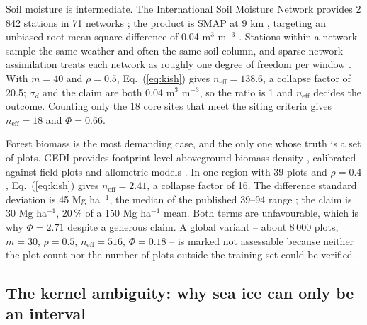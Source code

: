 \documentclass[preprint,12pt,authoryear]{elsarticle}
\begin{document}
Soil moisture is intermediate. The International Soil Moisture Network provides 2\,842 stations in 71 networks \citep{dorigo2011international,dorigo2021international}; the product is SMAP at 9 km \citep{entekhabi2010soil}, targeting an unbiased root-mean-square difference of 0.04 m$^3$ m$^{-3}$ \citep{colliander2017validation}. Stations within a network sample the same weather and often the same soil column, and sparse-network assimilation treats each network as roughly one degree of freedom per window \citep{gruber2018sparse}. With $m = 40$ and $\rho = 0.5$, Eq.~(\ref{eq:kish}) gives $n_{\mathrm{eff}} = 138.6$, a collapse factor of 20.5; $\sigma_d$ and the claim are both 0.04 m$^3$ m$^{-3}$, so the ratio is 1 and $n_{\mathrm{eff}}$ decides the outcome. Counting only the 18 core sites that meet the siting criteria gives $n_{\mathrm{eff}} = 18$ and $\Phi = 0.66$.

Forest biomass is the most demanding case, and the only one whose truth is a set of plots. GEDI provides footprint-level aboveground biomass density \citep{dubayah2020global,duncanson2022aboveground,gedi_l4a}, calibrated against field plots and allometric models \citep{chave2014improved,saatchi2011benchmark}. In one region with 39 plots and $\rho = 0.4$, Eq.~(\ref{eq:kish}) gives $n_{\mathrm{eff}} = 2.41$, a collapse factor of 16. The difference standard deviation is 45 Mg ha$^{-1}$, the median of the published 39--94 range \citep{duncanson2022aboveground,xu2021changes,saatchi2011benchmark}; the claim is 30 Mg ha$^{-1}$, 20\,\% of a 150 Mg ha$^{-1}$ mean. Both terms are unfavourable, which is why $\Phi = 2.71$ despite a generous claim. A global variant -- about 8\,000 plots, $m = 30$, $\rho = 0.5$, $n_{\mathrm{eff}} = 516$, $\Phi = 0.18$ -- is marked not assessable because neither the plot count nor the number of plots outside the training set could be verified.

\subsection{The kernel ambiguity: why sea ice can only be an interval}
\label{sec:kernel}
\end{document}
